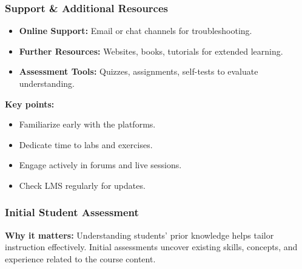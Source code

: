 \documentclass{beamer}
\begin{document}
\begin{frame}[fragile]
    \frametitle{Support \& Additional Resources}
    \begin{itemize}
        \item \textbf{Online Support:} Email or chat channels for troubleshooting.
        \item \textbf{Further Resources:} Websites, books, tutorials for extended learning.
        \item \textbf{Assessment Tools:} Quizzes, assignments, self-tests to evaluate understanding.
    \end{itemize}
    \vspace{0.5cm}
    \textbf{Key points:}
    \begin{itemize}
        \item Familiarize early with the platforms.
        \item Dedicate time to labs and exercises.
        \item Engage actively in forums and live sessions.
        \item Check LMS regularly for updates.
    \end{itemize}
\end{frame}

\begin{frame}[fragile]
    \frametitle{Initial Student Assessment}
    \textbf{Why it matters:} Understanding students’ prior knowledge helps tailor instruction effectively. Initial assessments uncover existing skills, concepts, and experience related to the course content.
\end{frame}
\end{document}
